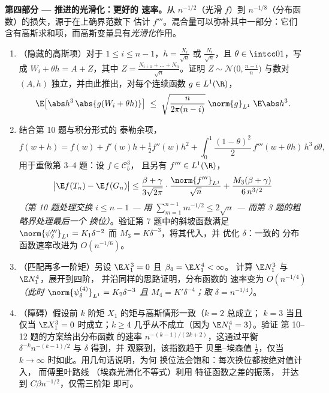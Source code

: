 \begin{problem}
\medskip
\noindent\textbf{第四部分 --- 推进的光滑化：更好的
速率。}从 $n^{-1/2}$（光滑 $f$）到
$n^{-1/8}$（分布函数）的损失，源于在上确界范数下
估计 $f'''$。混合量可以弥补其中一部分：它们
含有高斯求和项，而高斯变量具有\emph{光滑化}作用。
\begin{enumerate}[resume]
  \item （隐藏的高斯项）对于 $1 \leq i \leq n - 1$，$h =
        \frac{X_i}{\sqrt n}$ 或 $\frac{N_i}{\sqrt n}$，且
        $\theta \in \intcc01$，写成 $W_i + \theta h = A +
        Z$，其中 $Z = \frac{N_{i+1} + \dots + N_n}{\sqrt
        n}$。证明 $Z \sim \mathcal N\bigl(0,
        \frac{n-i}n\bigr)$ 与数对 $(A,
        h)$ 独立，并由此推出，对每个连续函数 $g \in
        L^1(\R)$，
        \[
        \E\bigl[\abs h^3\,\abs{g(W_i + \theta h)}\bigr]
        \;\leq\; \sqrt{\frac{n}{2\pi(n - i)}}\;
        \norm{g}_{L^1}\;\E\abs h^3 .
        \]
  \item 结合第 10 题与积分形式的
        泰勒余项，
        \[
        f(w + h) = f(w) + f'(w)h + \tfrac12f''(w)h^2 +
        \int_0^1\frac{(1 - \theta)^2}2\,f'''(w + \theta
        h)\,h^3\,\dd\theta,
        \]
        用于重做第 3--4 题：设 $f \in \mathcal C^3_b$，
        且另有 $f''' \in L^1(\R)$，
        \[
        \bigl|\E f(T_n) - \E f(G_n)\bigr| \leq
        \frac{\beta + \gamma}{3\sqrt{2\pi}}\cdot
        \frac{\norm{f'''}_{L^1}}{\sqrt n} +
        \frac{M_3(\beta + \gamma)}{6\,n^{3/2}}
        \]
        \emph{（第 10 题处理交换 $i \leq n - 1$
        --- 用 $\sum_{m=1}^{n-1}m^{-1/2} \leq 2\sqrt n$
        --- 而第 3 题的粗略界处理最后一个
        换位）}。验证第 7 题中的斜坡函数满足
        $\norm{\psi_\delta'''}_{L^1} = K_1\delta^{-2}$
        而 $M_3 = K\delta^{-3}$，将其代入，并
        优化 $\delta$：一致的
        分布函数速率改进为
        $O(n^{-1/6})$。
  \item （匹配再多一阶矩）另设 $\E
        X_1^3 = 0$ 且 $\beta_4 = \E X_1^4 < \infty$。
        计算 $\E N_1^3$ 与 $\E N_1^4$，展开到四阶，
        并沿同样的思路证明，分布函数的
        速率变为 $O(n^{-1/4})$
        \emph{（此时 $\norm{\psi_\delta^{(4)}}_{L^1} =
        K_2\delta^{-3}$ 且 $M_4 = K'\delta^{-4}$；取
        $\delta = n^{-1/4}$）}。
  \item （障碍）假设前 $k$ 阶矩
        $X_1$ 的矩与高斯情形一致（$k = 2$ 总成立；
        $k = 3$ 当且仅当 $\E X_1^3 = 0$ 时成立；$k \geq 4$
        几乎从不成立（因为 $\E N_1^4 = 3$）。验证
        第 10--12 题的方案给出分布函数
        的速率
        $n^{-(k-1)/(2k+2)}$，这通过平衡
        $\delta^{-k}n^{-(k-1)/2}$ 与 $\delta$ 得到，并
        观察到，该指数趋于
        贝里--埃森值 $\frac12$，仅当 $k \to
        \infty$ 时如此。用几句话说明，为何
        换位法会饱和：每次换位都按绝对值计入，
        而傅里叶路线
        （埃森光滑化不等式）利用
        特征函数之差的振荡，
        并达到 $C\beta n^{-1/2}$，仅需三阶矩
        即可。
\end{enumerate}


\end{problem}
